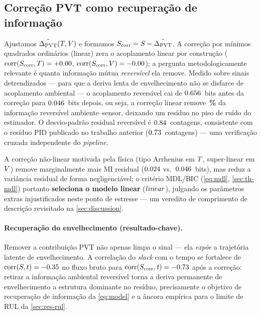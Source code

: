 \subsection{Correção PVT como recuperação de informação}
\label{sec:res-correction}
Ajustamos $\hat{\Delta_{\mathrm{PVT}}}(T,V)$ e formamos $S_{\mathrm{corr}}=S-\hat{\Delta_{\mathrm{PVT}}}$. A
correção por mínimos quadrados ordinários (linear) zera o acoplamento linear
por construção ($\operatorname{corr}(S_{\mathrm{corr}},T)=+0.00$,
$\operatorname{corr}(S_{\mathrm{corr}},V)=-0.00$); a pergunta metodologicamente
relevante é quanta informação mútua \emph{reversível} ela remove. Medido
sobre sinais detrendizados --- para que a deriva lenta de envelhecimento não
se disfarce de acoplamento ambiental --- o acoplamento reversível cai de
$0.656$~bits antes da correção para $0.046$~bits depois, ou
seja, a correção linear remove \textbf{\valMIreductionPct\,\%} da informação
reversível ambiente--sensor, deixando um resíduo no piso de ruído do
estimador. O desvio-padrão residual reversível é $0.84$~contagens,
consistente com o resíduo PID publicado no trabalho anterior
($0.73$~contagens) --- uma verificação cruzada independente do
\emph{pipeline}.

A correção não-linear motivada pela física (tipo Arrhenius em $T$,
super-linear em $V$) remove marginalmente mais MI residual
($0.024$ vs.\ $0.046$~bits), mas reduz a variância residual
de forma negligenciável; o critério MDL/BIC (\cref{eq:mdl},
\cref{sec:th-mdl}) portanto \textbf{seleciona o modelo linear}
($linear$), julgando os parâmetros extras injustificados neste ponto
de estresse --- um veredito de comprimento de descrição revisitado na
\cref{sec:discussion}.

\paragraph{Recuperação do envelhecimento (resultado-chave).} Remover a
contribuição PVT não apenas limpa o sinal --- ela \emph{expõe} a trajetória
latente de envelhecimento. A correlação do \emph{slack} com o tempo se
fortalece de $\operatorname{corr}(S,t)=-0.35$ no fluxo bruto
para $\operatorname{corr}(S_{\mathrm{corr}},t)=-0.73$ após a correção:
retirar a informação ambiental reversível torna a deriva permanente de
envelhecimento a estrutura dominante no resíduo, precisamente o objetivo de
recuperação de informação da \cref{eq:model} e a âncora empírica para o
limite de RUL da \cref{sec:res-rul}.

